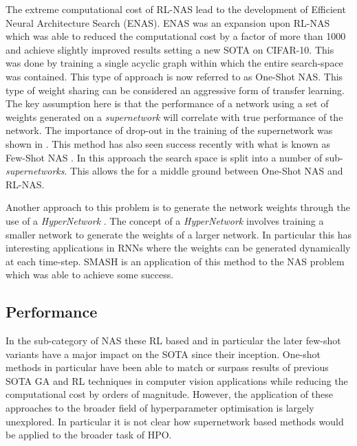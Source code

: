 \documentclass{article}
\begin{document}
  
	The extreme computational cost of RL-NAS lead to the development of Efficient Neural Architecture Search (ENAS). ENAS \cite{ENAS} was an expansion upon RL-NAS which was able to reduced the computational cost by a factor of more than 1000 and achieve slightly improved results setting a new SOTA on CIFAR-10. This was done by training a single acyclic graph within which the entire search-space was contained. This type of approach is now referred to as One-Shot NAS. This type of weight sharing can be considered an aggressive form of transfer learning. The key assumption here is that the performance of a network using a set of weights generated on a \textit{supernetwork} will correlate with true performance of the network. The importance of drop-out in the training of the supernetwork was shown in \cite{ENAS-T}. This method has also seen success recently with what is known as Few-Shot NAS \cite{fewshot}. In this approach the search space is split into a number of sub-\textit{supernetworks}. This allows the for a middle ground between One-Shot NAS and RL-NAS. 
	\par
	Another approach to this problem is to generate the network weights through the use of a \textit{HyperNetwork} \cite{hypernetworks}. The concept of a \textit{HyperNetwork} involves training a smaller network to generate the weights of a larger network. In particular this has interesting applications in RNNs where the weights can be generated dynamically at each time-step. SMASH \cite{smash} is an application of this method to the NAS problem which was able to achieve some success.  

\subsection{Performance}

	In the sub-category of NAS these RL based and in particular the later few-shot variants have a major impact on the SOTA since their inception. One-shot methods in particular have been able to match or surpass results of previous SOTA GA and RL techniques in computer vision applications while reducing the computational cost by orders of magnitude. However, the application of these approaches to the broader field of hyperparameter optimisation is largely unexplored. In particular it is not clear how supernetwork based methods would be applied to the broader task of HPO. 

\end{document}
